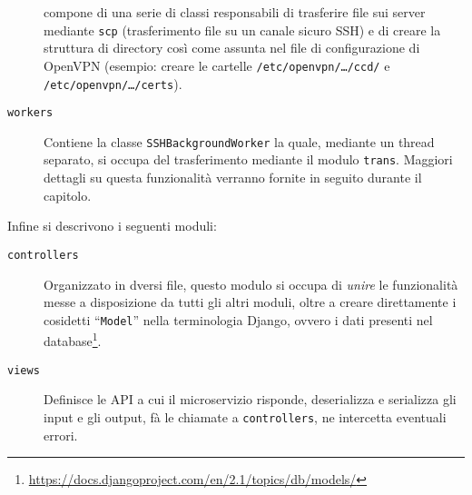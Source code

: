 \begin{description}
  compone di una serie di classi responsabili di trasferire file sui server mediante
  \texttt{scp} (trasferimento file su un canale sicuro SSH) e di creare
  la struttura di directory così come assunta nel file di configurazione di OpenVPN
  (esempio: creare le cartelle \texttt{/etc/openvpn/\ldots/ccd/} e \texttt{/etc/openvpn/\ldots/certs}).
  \item[\texttt{workers}]Contiene la classe \texttt{SSHBackgroundWorker} la quale, mediante
  un thread separato, si occupa del trasferimento mediante il modulo \texttt{trans}.
  Maggiori dettagli su questa funzionalità verranno fornite in seguito durante
  il capitolo.
\end{description}

Infine si descrivono i seguenti moduli:
\begin{description}
  \item[\texttt{controllers}]Organizzato in dversi file, questo modulo si occupa di
  \textit{unire} le funzionalità messe a disposizione da tutti gli altri moduli,
  oltre a creare direttamente i cosidetti ``\texttt{Model}'' nella terminologia Django,
  ovvero i dati presenti nel database\footnote{\url{https://docs.djangoproject.com/en/2.1/topics/db/models/}}.
  \item[\texttt{views}]Definisce le API a cui il microservizio risponde, deserializza e serializza
  gli input e gli output, fà le chiamate a \texttt{controllers}, ne intercetta eventuali errori.
\end{description}
